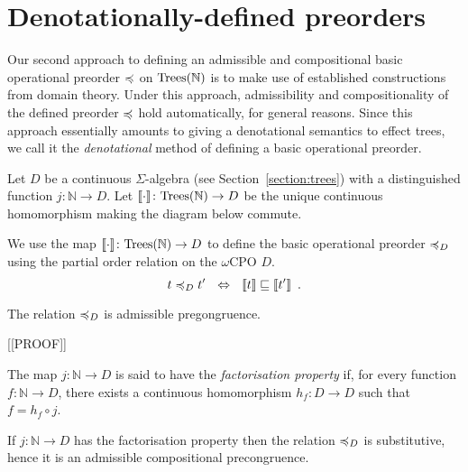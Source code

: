 \section{Denotationally-defined preorders}

Our second approach to defining an admissible and compositional basic operational
preorder $\preccurlyeq$ on $\textnormal{Trees}(\mathbb{N})$ is to make use of established constructions from domain theory.
Under this approach, admissibility and compositionality of the defined preorder $\preccurlyeq$ hold automatically,
for general reasons. Since this approach essentially amounts to giving a denotational semantics to effect trees, we call it the 
\emph{denotational} method of defining a basic operational preorder.

Let $D$ be a continuous $\Sigma$-algebra (see Section~\ref{section:trees}) with a distinguished function 
$j\colon \mathbb{N} \to D$. Let   $\llbracket \cdot \rrbracket \colon \textnormal{Trees}(\mathbb{N}) \to D$ be the unique continuous homomorphism
making the diagram below commute.
   \begin{center}
    \end{center}
\noindent
We use the map $\llbracket \cdot \rrbracket \colon \textnormal{Trees}(\mathbb{N}) \to D$ to define 
the basic operational preorder $\preccurlyeq_D$ using the partial order relation on the $\omega$CPO $D$.
\[
t \preccurlyeq_D t' ~~ \Leftrightarrow ~~ \llbracket t \rrbracket \sqsubseteq \llbracket t'  \rrbracket \enspace .
\]
\begin{aproposition}
The relation $\preccurlyeq_D$ is admissible pregongruence.
\end{aproposition}

[[PROOF]]

\begin{adefinition}
    The map $j\colon \mathbb{N} \to D$ is said to have  the \emph{factorisation property} if,
    for every function $f \colon \mathbb{N} \to D$, there exists a 
    continuous homomorphism $h_f : D \to D$ such that $f = h_f \circ j$.
    \begin{center}
    \end{center}
\end{adefinition}
\begin{aproposition}
If $j\colon \mathbb{N} \to D$ has the factorisation property then 
the relation $\preccurlyeq_D$ is substitutive, hence it is an admissible compositional precongruence.
\end{aproposition}

